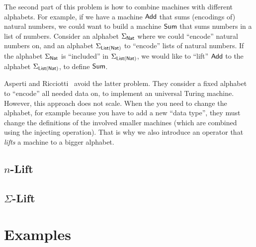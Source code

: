 The second part of this problem is how to combine machines with different alphabets.  For example, if we have a machine $\textsf{Add}$ that sums
(encodings of) natural numbers, we could want to build a machine $\textsf{Sum}$ that sums numbers in a list of numbers.  Consider an alphabet
$\Sigma_{\textsf{Nat}}$ where we could ``encode'' natural numbers on, and an alphabet $\Sigma_{\textsf{List}(\textsf{Nat})}$ to ``encode'' lists of natural numbers.  If the
alphabet $\Sigma_{\textsf{Nat}}$ is ``included'' in $\Sigma_{\textsf{List}(\textsf{Nat})}$, we would like to ``lift'' $\textsf{Add}$ to the alphabet $\Sigma_{\textsf{List}(\textsf{Nat})}$, to
define $\textsf{Sum}$.

Asperti and Ricciotti~\cite{asperti2015} avoid the latter problem.  They consider a fixed alphabet to ``encode'' all needed data on, to implement an
universal Turing machine.  However, this approach does not scale.  When the you need to change the alphabet, for example because you have to add a new
``data type'', they must change the definitions of the involved smaller machines (which are combined using the injecting operation).  That is why we
also introduce an operator that \emph{lifts} a machine to a bigger alphabet.

\subsection{$n$-Lift}
\label{sec:n-Lift}

\todo{}


\subsection{$\Sigma$-Lift}
\label{sec:sigma-Lift}


\todo{}




\section{Examples}
\label{sec:combining-examples}




